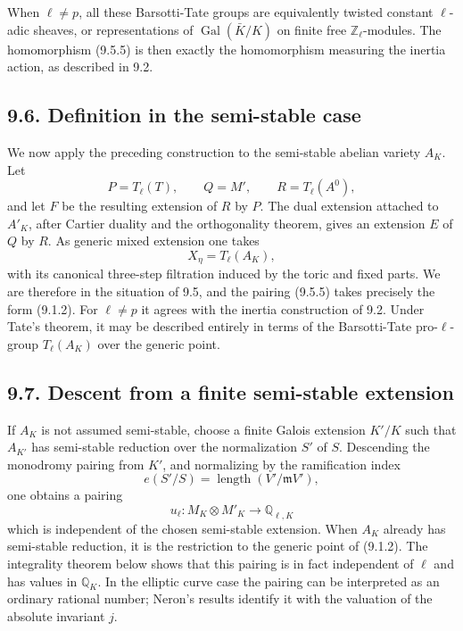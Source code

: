 \documentclass[11pt]{article}
\newcommand{\Gal}{\operatorname{Gal}}
\newcommand{\Z}{\mathbb Z}
\newcommand{\Q}{\mathbb Q}
\begin{document}
When \(\ell\ne p\), all these Barsotti-Tate groups are equivalently twisted constant \(\ell\)-adic sheaves, or representations of \(\Gal(\bar K/K)\) on finite free \(\Z_\ell\)-modules.  The homomorphism (9.5.5) is then exactly the homomorphism measuring the inertia action, as described in 9.2.

\subsection*{9.6. Definition in the semi-stable case}
We now apply the preceding construction to the semi-stable abelian variety \(A_K\).  Let
\begin{equation}\tag{9.6.1}
        P=T_\ell(T),\qquad Q=M',\qquad R=T_\ell(A^0),
\end{equation}
and let \(F\) be the resulting extension of \(R\) by \(P\).  The dual extension attached to \(A'_K\), after Cartier duality and the orthogonality theorem, gives an extension \(E\) of \(Q\) by \(R\).  As generic mixed extension one takes
\begin{equation}\tag{9.6.2}
        X_\eta=T_\ell(A_K),
\end{equation}
with its canonical three-step filtration induced by the toric and fixed parts.  We are therefore in the situation of 9.5, and the pairing (9.5.5) takes precisely the form (9.1.2).  For \(\ell\ne p\) it agrees with the inertia construction of 9.2.  Under Tate's theorem, it may be described entirely in terms of the Barsotti-Tate pro-\(\ell\)-group \(T_\ell(A_K)\) over the generic point.

\subsection*{9.7. Descent from a finite semi-stable extension}
If \(A_K\) is not assumed semi-stable, choose a finite Galois extension \(K'/K\) such that \(A_{K'}\) has semi-stable reduction over the normalization \(S'\) of \(S\).  Descending the monodromy pairing from \(K'\), and normalizing by the ramification index
\[
        e(S'/S)=\operatorname{length}(V'/\mathfrak m V'),
\]
one obtains a pairing
\begin{equation}\tag{9.7.1}
        u_\ell:M_K\otimes M'_K\longrightarrow \Q_{\ell,K}
\end{equation}
which is independent of the chosen semi-stable extension.  When \(A_K\) already has semi-stable reduction, it is the restriction to the generic point of (9.1.2).  The integrality theorem below shows that this pairing is in fact independent of \(\ell\) and has values in \(\Q_K\).  In the elliptic curve case the pairing can be interpreted as an ordinary rational number; Neron's results identify it with the valuation of the absolute invariant \(j\).
\end{document}
